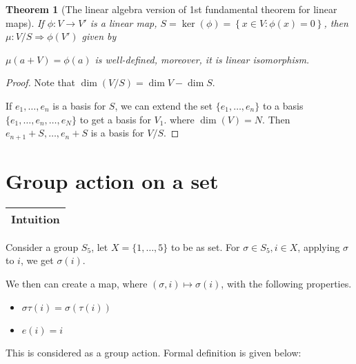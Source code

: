 \documentclass{article}
\theoremstyle{MyNonumberplain}
\theoremstyle{break}
\newtheorem*{proof}{Proof. }
\newcommand{\p}{\phi}
\theoremstyle{break}
\newtheorem{theorem}{Theorem}[section]
\theoremstyle{break}
\theoremstyle{definition}
\theoremstyle{break}
\begin{document}
\begin{thmbox}
    \begin{theorem}[The linear algebra version of 1st fundamental theorem for linear maps]
        If $\p : V \rightarrow V'$ is a linear map, $S = \ker \left( \p \right) =
        \left\{ x \in V : \p (x) = 0 \right\}$, then $\mu : V / S \Rightarrow \p (V')$
        given by

        $\mu (a + V) = \p (a)$ is well-defined, moreover, it is linear isomorphism.
    \end{theorem}
    \begin{prfbox}
        \begin{proof}
            Note that $\dim (V / S) = \dim V - \dim S$.\bigskip

            If $e_1, \ldots, e_n$ is a basis for $S$, we can extend the set $\{ e_1,
            \ldots, e_n \}$ to a basis $\{ e_1, \ldots, e_n, \ldots, e_N \}$ to get a
            basis for $V_1$. where $\dim (V) = N$. Then $e_{n + 1} + S, \ldots, e_n + S$
            is a basis for $V / S$.
        \end{proof}
    \end{prfbox}
\end{thmbox}

\newpage

\setcounter{section}{15}

\section{Group action on a set}

    \begin{tabular}{|c|}
        \hline
        Intuition\\
        \hline
    \end{tabular}
    
    Consider a group $S_5$, let $X = \{ 1, \ldots, 5 \}$ to be as set. For $\sigma
    \in S_5, i \in X$, applying $\sigma$ to $i$, we get $\sigma (i)$.
    
    We then can create a map, where $(\sigma, i) \mapsto \sigma (i)$, with the
    following properties.
    \begin{itemize}
        \item $\sigma \tau (i) = \sigma (\tau (i))$
        
        \item $e (i) = i$
    \end{itemize}
    This is considered as a group action. Formal definition is given below:
\end{document}
